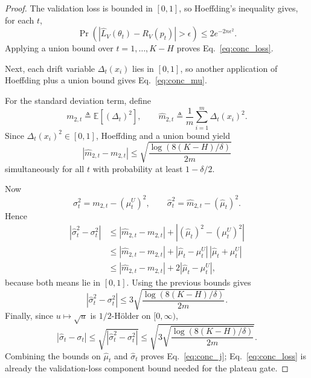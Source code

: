\documentclass{article}
\newcommand{\EE}{\mathbb{E}}
\begin{document}
\begin{proof}
The validation loss is bounded in $[0,1]$, so Hoeffding's inequality gives, for each $t$,
\begin{equation}
    \Pr\!\left(
        \left| \hat L_V(\theta_t)-R_V(p_t) \right| > \epsilon
    \right)
    \le
    2e^{-2n\epsilon^2}.
\end{equation}
Applying a union bound over $t=1,\dots,K-H$ proves Eq.~\eqref{eq:conc_loss}.

Next, each drift variable $\Delta_t(x_i)$ lies in $[0,1]$, so another application of Hoeffding plus a union bound gives Eq.~\eqref{eq:conc_mu}.

For the standard deviation term, define
\begin{equation}
    m_{2,t} \triangleq \EE[(\Delta_t)^2],
    \qquad
    \hat m_{2,t} \triangleq \frac{1}{m}\sum_{i=1}^{m}\Delta_t(x_i)^2.
\end{equation}
Since $\Delta_t(x_i)^2\in[0,1]$, Hoeffding and a union bound yield
\begin{equation}
    |\hat m_{2,t}-m_{2,t}|
    \le
    \sqrt{\frac{\log(8(K-H)/\delta)}{2m}}
\end{equation}
simultaneously for all $t$ with probability at least $1-\delta/2$.

Now
\begin{equation}
    \sigma_t^2 = m_{2,t} - (\mu_t^U)^2,
    \qquad
    \hat \sigma_t^2 = \hat m_{2,t} - (\hat \mu_t)^2.
\end{equation}
Hence
\begin{align}
    |\hat \sigma_t^2 - \sigma_t^2|
    &\le
    |\hat m_{2,t}-m_{2,t}| + |(\hat \mu_t)^2-(\mu_t^U)^2| \\
    &\le
    |\hat m_{2,t}-m_{2,t}| + |\hat \mu_t-\mu_t^U|\,|\hat \mu_t+\mu_t^U| \\
    &\le
    |\hat m_{2,t}-m_{2,t}| + 2|\hat \mu_t-\mu_t^U|,
\end{align}
because both means lie in $[0,1]$. Using the previous bounds gives
\begin{equation}
    |\hat \sigma_t^2 - \sigma_t^2|
    \le
    3\sqrt{\frac{\log(8(K-H)/\delta)}{2m}}.
\end{equation}
Finally, since $u\mapsto \sqrt{u}$ is $1/2$-H\"older on $[0,\infty)$,
\begin{equation}
    |\hat \sigma_t - \sigma_t|
    \le
    \sqrt{|\hat \sigma_t^2 - \sigma_t^2|}
    \le
    \sqrt{
        3\sqrt{\frac{\log(8(K-H)/\delta)}{2m}}
    }.
\end{equation}
Combining the bounds on $\hat\mu_t$ and $\hat\sigma_t$ proves Eq.~\eqref{eq:conc_j}; Eq.~\eqref{eq:conc_loss} is already the validation-loss component bound needed for the plateau gate.
\end{proof}
\end{document}
